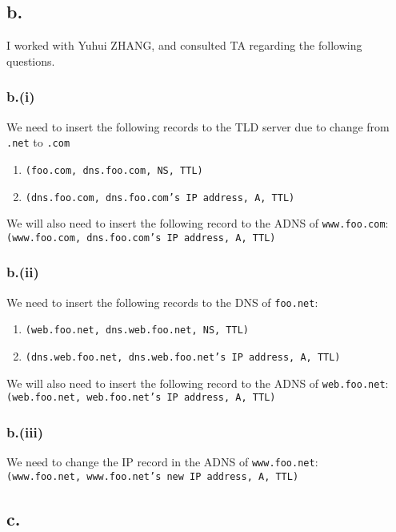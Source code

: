 \documentclass[12pt]{article}
\newcommand{\ilc}{\texttt}
\begin{document}
\subsection{b.}
I worked with Yuhui ZHANG, and consulted TA regarding the following questions.

\subsubsection{b.(i)}
We need to insert the following records to the TLD server due to change from \ilc{.net} to \ilc{.com}
\begin{enumerate}
    \item \ilc{(foo.com, dns.foo.com, NS, TTL)}
    \item \ilc{(dns.foo.com, dns.foo.com's IP address, A, TTL)}
\end{enumerate}
We will also need to insert the following record to the ADNS of \ilc{www.foo.com}:\\
\indent \ilc{(www.foo.com, dns.foo.com's IP address, A, TTL)}

\subsubsection{b.(ii)}
We need to insert the following records to the DNS of \ilc{foo.net}:
\begin{enumerate}
    \item \ilc{(web.foo.net, dns.web.foo.net, NS, TTL)}
    \item \ilc{(dns.web.foo.net, dns.web.foo.net's IP  address, A, TTL)}
\end{enumerate}
We will also need to insert the following record to the ADNS of \ilc{web.foo.net}:\\
\indent \ilc{(web.foo.net, web.foo.net's IP address, A, TTL)}

\subsubsection{b.(iii)}

We need to change the IP record in the ADNS of \ilc{www.foo.net}: \\
\indent \ilc{(www.foo.net, www.foo.net's new IP address, A, TTL)}


\subsection{c.}
\end{document}
